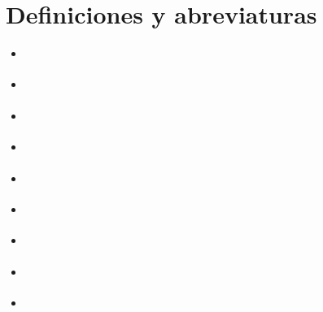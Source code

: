 \section{Definiciones y abreviaturas}
\begin{itemize}
	\item \textbf{}
	\item \textbf{}
	\item \textbf{}
	\item \textbf{}
	\item \textbf{}
	\item \textbf{}
	\item \textbf{}
	\item \textbf{}
	\item \textbf{}
\end{itemize}